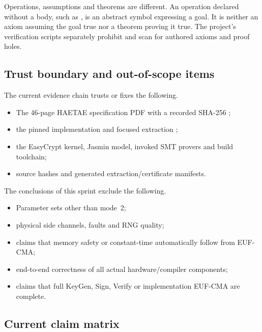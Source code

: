 \begin{caution}
Operations, assumptions and theorems are different. An operation declared without
a body, such as , is an abstract
symbol expressing a goal. It is neither an axiom assuming the goal true nor a
theorem proving it true. The project's verification scripts separately prohibit
and scan for authored axioms and proof holes.
\end{caution}

\subsection{Trust boundary and out-of-scope items}

The current evidence chain trusts or fixes the following.

\begin{itemize}
  \item The 46-page HAETAE specification PDF with a recorded SHA-256 \cite{haetae-spec};
  \item the pinned  implementation and focused
        extraction \cite{pinned-jasmin};
  \item the EasyCrypt kernel, Jasmin model, invoked SMT provers and build toolchain;
  \item source hashes and generated extraction/certificate manifests.
\end{itemize}

The conclusions of this sprint exclude the following.

\begin{itemize}
  \item Parameter sets other than mode~2;
  \item physical side channels, faults and RNG quality;
  \item claims that memory safety or constant-time automatically follow from EUF-CMA;
  \item end-to-end correctness of all actual hardware/compiler components;
  \item claims that full KeyGen, Sign, Verify or implementation EUF-CMA are complete.
\end{itemize}

\subsection{Current claim matrix}

